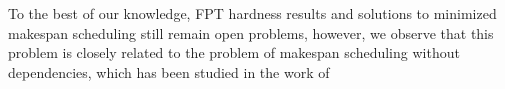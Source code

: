 To the best of our knowledge, FPT hardness results and solutions to
minimized makespan scheduling still remain open problems, however, we observe
that this problem is closely related to the problem of makespan scheduling
without dependencies, which has been studied in the work of


